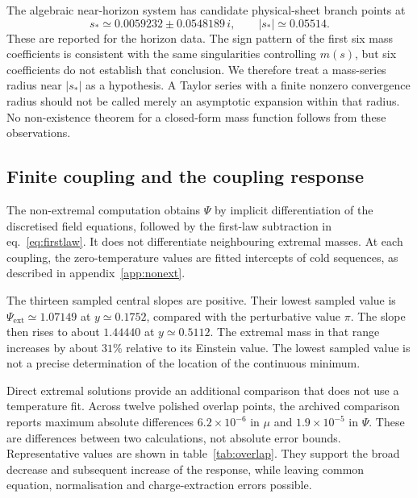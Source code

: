 \documentclass[11pt,a4paper]{article}
\newcommand{\ext}{\mathrm{ext}}
\begin{document}
The algebraic near-horizon system has candidate physical-sheet branch points at
\begin{equation}
 s_*\simeq0.0059232\pm0.0548189\,i,\qquad |s_*|\simeq0.05514.
 \label{eq:branchpoints}
\end{equation}
These are reported for the horizon data. The sign pattern of the first six mass coefficients is consistent with the same singularities controlling $m(s)$, but six coefficients do not establish that conclusion. We therefore treat a mass-series radius near $|s_*|$ as a hypothesis. A Taylor series with a finite nonzero convergence radius should not be called merely an asymptotic expansion within that radius. No non-existence theorem for a closed-form mass function follows from these observations.

\subsection{Finite coupling and the coupling response}
The non-extremal computation obtains $\Psi$ by implicit differentiation of the discretised field equations, followed by the first-law subtraction in eq.~\eqref{eq:firstlaw}. It does not differentiate neighbouring extremal masses. At each coupling, the zero-temperature values are fitted intercepts of cold sequences, as described in appendix~\ref{app:nonext}.

The thirteen sampled central slopes are positive. Their lowest sampled value is $\Psi_\ext\simeq1.07149$ at $y\simeq0.1752$, compared with the perturbative value $\pi$. The slope then rises to about $1.44440$ at $y\simeq0.5112$. The extremal mass in that range increases by about $31\%$ relative to its Einstein value. The lowest sampled value is not a precise determination of the location of the continuous minimum.

Direct extremal solutions provide an additional comparison that does not use a temperature fit. Across twelve polished overlap points, the archived comparison reports maximum absolute differences $6.2\times10^{-6}$ in $\mu$ and $1.9\times10^{-5}$ in $\Psi$. These are differences between two calculations, not absolute error bounds. Representative values are shown in table~\ref{tab:overlap}. They support the broad decrease and subsequent increase of the response, while leaving common equation, normalisation and charge-extraction errors possible.
\end{document}
